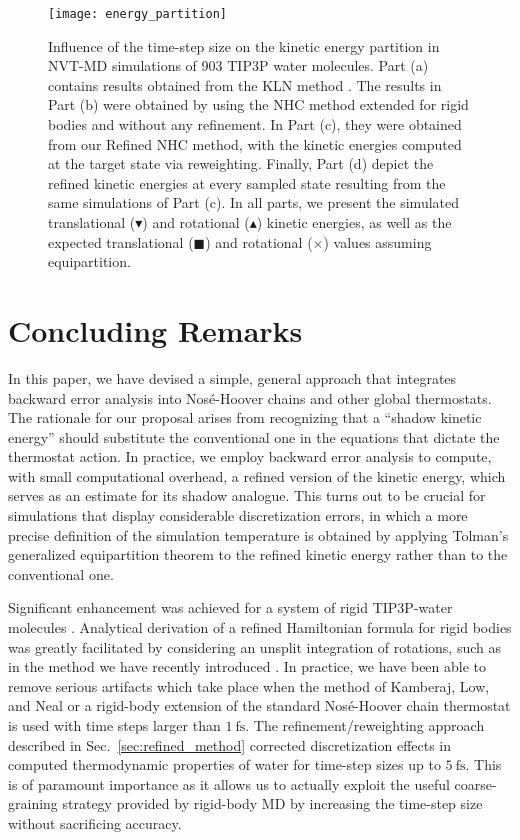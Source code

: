 \documentclass[
	aip,
	jcp,
	reprint,
]{revtex4-1}
\begin{document}
\begin{figure*}
	\texttt{[image: energy\_partition]}
		\caption{Influence of the time-step size on the kinetic energy partition in NVT-MD simulations of 903 TIP3P \cite{Jorgensen_1983} water molecules.
		Part (a) contains results obtained from the KLN method \cite{Kamberaj_2005}.
		The results in Part (b) were obtained by using the NHC method \cite{Martyna_1996} extended for rigid bodies and without any refinement.
		In Part (c), they  were obtained from our Refined NHC \cite{Martyna_1996} method, with the kinetic energies computed at the target state via reweighting.
		Finally, Part (d) depict the refined kinetic energies at every sampled state resulting from the same simulations of Part (c).
		In all parts, we present the simulated translational ($\blacktriangledown$) and rotational ($\blacktriangle$) kinetic energies, as well as the expected translational ($\blacksquare$) and rotational ($\times$) values assuming equipartition.}
	\label{fig:energy_partition}
\end{figure*}

\section{Concluding Remarks}
\label{sec:conclusion}

In this paper, we have devised a simple, general approach that integrates backward error analysis into Nos\'{e}-Hoover chains and other global thermostats.
The rationale for our proposal arises from recognizing that a ``shadow kinetic energy'' should substitute the conventional one in the equations that dictate the thermostat action.
In practice, we employ backward error analysis to compute, with small computational overhead, a refined version of the kinetic energy, which serves as an estimate for its shadow analogue.
This turns out to be crucial for simulations that display considerable discretization errors, in which a more precise definition of the simulation temperature \cite{Eastwood_2010} is obtained by applying Tolman's generalized equipartition theorem to the refined kinetic energy rather than to the conventional one.

Significant enhancement was achieved for a system of rigid TIP3P-water molecules \cite{Jorgensen_1983}.
Analytical derivation of a refined Hamiltonian formula for rigid bodies was greatly facilitated by considering an unsplit integration of rotations, such as in the method we have recently introduced \cite{Silveira_2017}.
In practice, we have been able to remove serious artifacts which take place when the method of Kamberaj, Low, and Neal \cite{Kamberaj_2005} or a rigid-body extension of the standard Nos\'{e}-Hoover chain thermostat \cite{Martyna_1992, Martyna_1996} is used with time steps larger than $1~\text{fs}$.
The refinement/reweighting approach described in Sec.~\ref{sec:refined_method} corrected discretization effects in computed thermodynamic properties of water for time-step sizes up to $5~\text{fs}$. This is of paramount importance as it allows us to actually exploit the useful coarse-graining strategy provided by rigid-body MD by increasing the time-step size without sacrificing accuracy.
\end{document}
